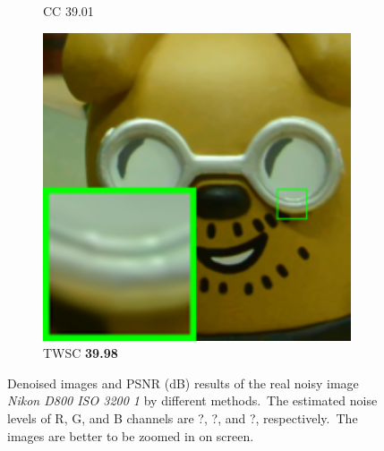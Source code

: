 \begin{figure}
\begin{subfigure}[t]{0.19\textwidth}
		\caption{CC 39.01}
    \end{subfigure}
    \hfill
    \begin{subfigure}[t]{0.19\textwidth}
        \centering
        \includegraphics[width=1\textwidth]{images/twsc/cc/resize_br_TWSC_d800_iso3200_1.png}
		\caption{TWSC \textbf{39.98}}
    \end{subfigure}
    \caption{Denoised images and PSNR (dB) results of the real noisy image \textsl{Nikon D800 ISO 3200 1} \cite{crosschannel2016} by different methods.\ The estimated noise levels of R, G, and B channels are ?, ?, and ?, respectively.\ The images are better to be zoomed in on screen.}
    \label{fig5-14}
\end{figure}



